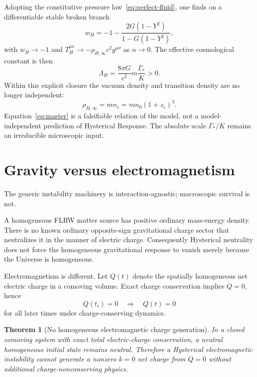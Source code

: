 \documentclass[11pt]{article}
\newtheorem{theorem}{Theorem}[section]
\theoremstyle{definition}
\theoremstyle{remark}
\begin{document}
Adopting the constitutive pressure law~\eqref{eq:perfect-fluid}, one finds on a differentiable stable broken branch
\begin{equation}
\label{eq:w-pole}
\boxed{w_H=-1-\frac{2G(1-Y^2)}{1-G(1-Y^2)},}
\end{equation}
with $w_H\to-1$ and $T_H^{\mu\nu}\to-\rho_{H,\infty}c^2 g^{\mu\nu}$ as $n\to0$.
The effective cosmological constant is then
\begin{equation}
\label{eq:Lambda-pole}
\boxed{\Lambda_H=\frac{8\pi G}{c^2}m\frac{\Gamma_*}{K}>0.}
\end{equation}
Within this explicit closure the vacuum density and transition density are no longer independent:
\begin{equation}
\label{eq:master}
\boxed{\rho_{H,\infty}=m n_c=m n_0(1+z_c)^3.}
\end{equation}
Equation~\eqref{eq:master} is a falsifiable relation of the model, not a model-independent prediction of Hysterical Response.
The absolute scale $\Gamma_*/K$ remains an irreducible microscopic input.

\section{Gravity versus electromagnetism}
\label{sec:em}
The generic instability machinery is interaction-agnostic; macroscopic survival is not.

A homogeneous FLRW matter source has positive ordinary mass-energy density.
There is no known ordinary opposite-sign gravitational charge sector that neutralizes it in the manner of electric charge.
Consequently Hysterical neutrality does not force the homogeneous gravitational response to vanish merely because the Universe is homogeneous.

Electromagnetism is different.
Let $Q(t)$ denote the spatially homogeneous net electric charge in a comoving volume.
Exact charge conservation implies $\dot Q=0$, hence
\begin{equation}
Q(t_i)=0\quad\Longrightarrow\quad Q(t)=0
\end{equation}
for all later times under charge-conserving dynamics.

\begin{theorem}[No homogeneous electromagnetic charge generation]
\label{thm:no-charge}
In a closed comoving system with exact total electric-charge conservation, a neutral homogeneous initial state remains neutral.
Therefore a Hysterical electromagnetic instability cannot generate a nonzero $k=0$ net charge from $Q=0$ without additional charge-nonconserving physics.
\end{theorem}
\end{document}

